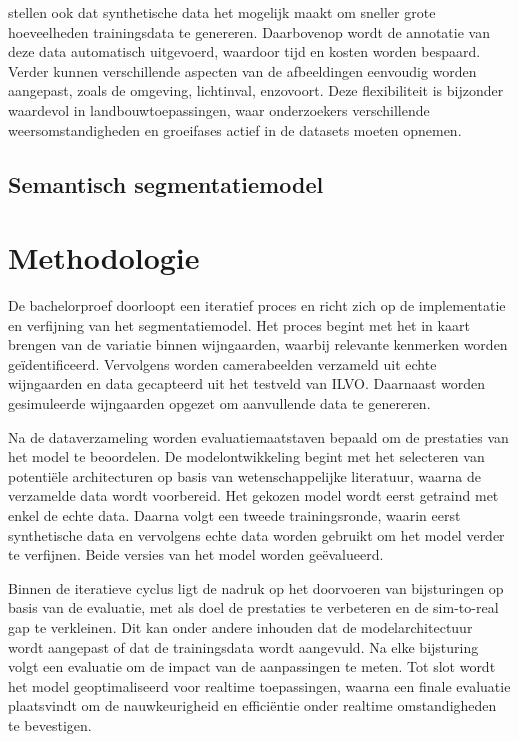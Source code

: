 \textcite{Anderson2022} stellen ook dat synthetische data het mogelijk maakt om sneller grote hoeveelheden trainingsdata te genereren. Daarbovenop wordt de annotatie van deze data automatisch uitgevoerd, waardoor tijd en kosten worden bespaard. Verder kunnen verschillende aspecten van de afbeeldingen eenvoudig worden aangepast, zoals de omgeving, lichtinval, enzovoort. Deze flexibiliteit is bijzonder waardevol in landbouwtoepassingen, waar onderzoekers verschillende weersomstandigheden en groeifases actief in de datasets moeten opnemen.

\subsection{Semantisch segmentatiemodel}





\section{Methodologie}%
\label{sec:methodologie}

De bachelorproef doorloopt een iteratief proces en richt zich op de implementatie en verfijning van het segmentatiemodel. Het proces begint met het in kaart brengen van de variatie binnen wijngaarden, waarbij relevante kenmerken worden geïdentificeerd. Vervolgens worden camerabeelden verzameld uit echte wijngaarden en data gecapteerd uit het testveld van ILVO. Daarnaast worden gesimuleerde wijngaarden opgezet om aanvullende data te genereren.

Na de dataverzameling worden evaluatiemaatstaven bepaald om de prestaties van het model te beoordelen. De modelontwikkeling begint met het selecteren van potentiële architecturen op basis van wetenschappelijke literatuur, waarna de verzamelde data wordt voorbereid. Het gekozen model wordt eerst getraind met enkel de echte data. Daarna volgt een tweede trainingsronde, waarin eerst synthetische data en vervolgens echte data worden gebruikt om het model verder te verfijnen. Beide versies van het model worden geëvalueerd.

Binnen de iteratieve cyclus ligt de nadruk op het doorvoeren van bijsturingen op basis van de evaluatie, met als doel de prestaties te verbeteren en de sim-to-real gap te verkleinen. Dit kan onder andere inhouden dat de modelarchitectuur wordt aangepast of dat de trainingsdata wordt aangevuld. Na elke bijsturing volgt een evaluatie om de impact van de aanpassingen te meten. Tot slot wordt het model geoptimaliseerd voor realtime toepassingen, waarna een finale evaluatie plaatsvindt om de nauwkeurigheid en efficiëntie onder realtime omstandigheden te bevestigen.

